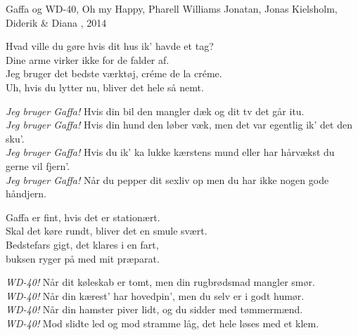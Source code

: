 \begin{song}{Gaffa og WD-40, Oh my}
  {} %
  {Happy, Pharell Williams} %
  {Jonatan, Jonas Kielsholm, Diderik \& Diana} %
  {\TKET{}, 2014} %
  {\NotCCLIed} %

  \begin{SBVerse}
    Hvad ville du gøre hvis dit hus ik' havde et tag?\\
    Dine arme virker ikke for de falder af.\\
    Jeg bruger det bedste værktøj, créme de la créme.\\
    Uh, hvis du lytter nu, bliver det hele så nemt.
  \end{SBVerse}

  \begin{SBChorus}
    \emph{Jeg bruger Gaffa!}
    Hvis din bil den mangler dæk og dit tv det går itu.\\
    \emph{Jeg bruger Gaffa!}
    Hvis din hund den løber væk, men det var egentlig ik’ det den sku’.\\
    \emph{Jeg bruger Gaffa!}
    Hvis du ik’ ka lukke kærstens mund eller har hårvækst du gerne vil fjern’.\\
    \emph{Jeg bruger Gaffa!}
    Når du pepper dit sexliv op men du har ikke nogen gode håndjern.
  \end{SBChorus}

  \begin{SBVerse}
    Gaffa er fint, hvis det er stationært.\\
    Skal det køre rundt, bliver det en smule svært.\\
    Bedstefars gigt, det klares i en fart,\\
    buksen ryger på med mit præparat.
  \end{SBVerse}

  \begin{SBChorus}
    \emph{WD-40!} Når dit køleskab er tomt, men din rugbrødsmad mangler smør.\\
    \emph{WD-40!} Når din kærest’ har hovedpin’, men du selv er i godt humør.\\
    \emph{WD-40!} Når din hamster piver lidt, og du sidder med tømmermænd.\\
    \emph{WD-40!} Mod slidte led og mod stramme låg, det hele løses med et klem.
  \end{SBChorus}


\end{song}
